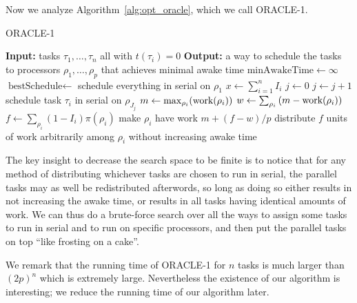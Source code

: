 Now we analyze Algorithm~\ref{alg:opt_oracle}, which we call
ORACLE-1. 

\begin{algorithm}
  \caption{ORACLE-1}
  \label{alg:opt_oracle}
  \begin{algorithmic}
    \State \textbf{Input:} tasks $\tau_1,\ldots, \tau_n$ all with $t(\tau_i) = 0$
    \State \textbf{Output:} a way to schedule the tasks to
    processors $\rho_1, \ldots, \rho_p$ that achieves minimal awake time
    \State 
    \State $\text{minAwakeTime} \gets \infty$
    \State $\text{bestSchedule} \gets $ schedule everything in serial on $\rho_1$
      \State $x \gets \sum_{i=1}^n I_i$
        \State $j \gets 0$
            \State $j \gets j+1$
            \State schedule task $\tau_i$ in serial on $\rho_{J_j}$
          \EndIf
        \EndFor
        \State $m \gets \max_{\rho_i}(\operatorname{\text{work}}(\rho_i))$
        \State $w \gets \sum_{\rho_i} \left( m - \operatorname{\text{work}}(\rho_i) \right)$
        \State $f \gets \sum_{\rho_i} (1-I_i)\pi(\rho_i)$
          \State make $\rho_i$ have work $m + (f-w)/p$
        \Else 
          \State distribute $f$ units of work arbitrarily 
          \State among $\rho_i$ without increasing awake time
        \EndIf
        \EndIf
      \EndFor
    \EndFor
  \end{algorithmic}
\end{algorithm}

The key insight to decrease the search space to be finite is to
notice that for any method of distributing whichever tasks are
chosen to run in serial, the parallel tasks may as well be
redistributed afterwords, so long as doing so either results in
not increasing the awake time, or results in all tasks having
identical amounts of work.
We can thus do a brute-force search over all the ways to assign some
tasks to run in serial and to run on specific processors, and
then put the parallel tasks on top \enquote{like frosting on a cake}. 

We remark that the running time of ORACLE-1 for $n$ tasks is much
larger than $(2p)^n$ which is extremely large. Nevertheless the
existence of our algorithm is interesting; we reduce the running
time of our algorithm later.

